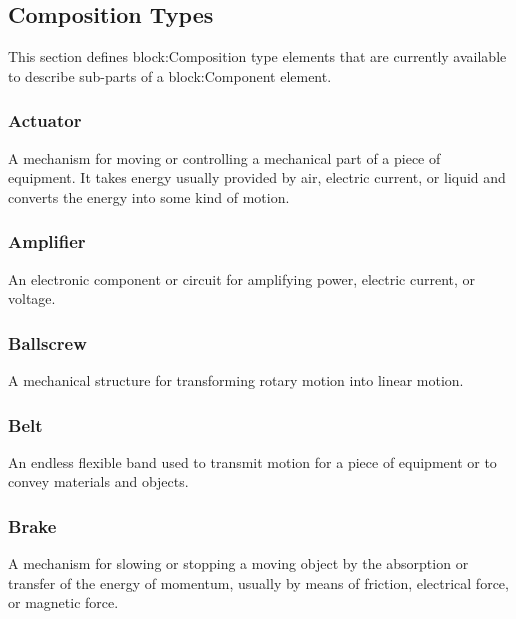 \subsection{Composition Types} \label{sec:CompositionTypes}

This section defines {block:Composition} type elements that are currently available to describe sub-parts of a {block:Component} element.


\subsubsection{Actuator}
  \label{sec:Actuator}


A mechanism for moving or controlling a mechanical part of a piece of equipment.   
 It takes energy usually provided by air, electric current, or liquid and converts the energy into some kind of motion. 

\FloatBarrier

\subsubsection{Amplifier}
  \label{sec:Amplifier}


An electronic component or circuit for amplifying power, electric current, or voltage.

\FloatBarrier

\subsubsection{Ballscrew}
  \label{sec:Ballscrew}


A mechanical structure for transforming rotary motion into linear motion.

\FloatBarrier

\subsubsection{Belt}
  \label{sec:Belt}


An endless flexible band used to transmit motion for a piece of equipment or to convey materials and objects.

\FloatBarrier

\subsubsection{Brake}
  \label{sec:Brake}


A mechanism for slowing or stopping a moving object by the absorption or transfer of the energy of momentum, usually by means of friction, electrical force, or magnetic force.

